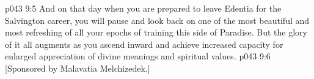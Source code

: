 \vs p043 9:5 And on that day when you are prepared to leave Edentia for the Salvington career, you will pause and look back on one of the most beautiful and most refreshing of all your epochs of training this side of Paradise. But the glory of it all augments as you ascend inward and achieve increased capacity for enlarged appreciation of divine meanings and spiritual values.
\vsetoff
\vs p043 9:6 [Sponsored by Malavatia Melchizedek.]
